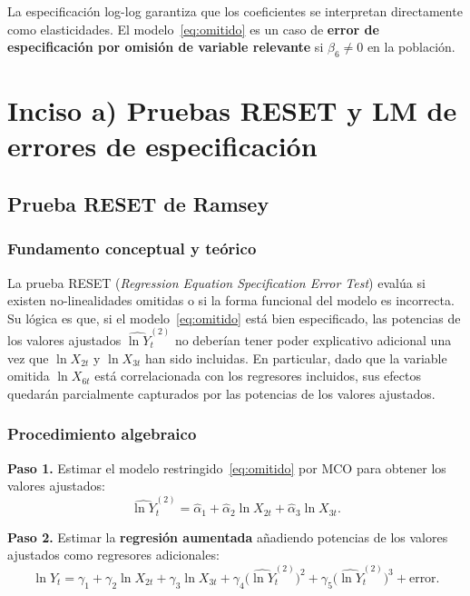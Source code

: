 \documentclass[12pt, letterpaper]{article}
\begin{document}
La especificación log-log garantiza que los coeficientes se interpretan
directamente como elasticidades. El modelo~\eqref{eq:omitido} es un
caso de \textbf{error de especificación por omisión de variable relevante}
si $\beta_6 \neq 0$ en la población.

\section{Inciso a) Pruebas RESET y LM de errores de especificación}

\subsection{Prueba RESET de Ramsey}

\subsubsection*{Fundamento conceptual y teórico}

La prueba RESET (\textit{Regression Equation Specification Error Test})
evalúa si existen no-linealidades omitidas o si la forma funcional del
modelo es incorrecta. Su lógica es que, si el modelo~\eqref{eq:omitido}
está bien especificado, las potencias de los valores ajustados
$\widehat{\ln Y}_t^{(2)}$ no deberían tener poder explicativo adicional
una vez que $\ln X_{2t}$ y $\ln X_{3t}$ han sido incluidas. En particular,
dado que la variable omitida $\ln X_{6t}$ está correlacionada con los
regresores incluidos, sus efectos quedarán parcialmente capturados por
las potencias de los valores ajustados.

\subsubsection*{Procedimiento algebraico}

\textbf{Paso 1.} Estimar el modelo restringido~\eqref{eq:omitido} por MCO
para obtener los valores ajustados:
\begin{equation}
  \widehat{\ln Y}_t^{(2)}
  = \hat{\alpha}_1 + \hat{\alpha}_2 \ln X_{2t} + \hat{\alpha}_3 \ln X_{3t}.
  \label{eq:yhat}
\end{equation}

\textbf{Paso 2.} Estimar la \textbf{regresión aumentada} añadiendo potencias
de los valores ajustados como regresores adicionales:
\begin{equation}
  \ln Y_t = \gamma_1 + \gamma_2 \ln X_{2t} + \gamma_3 \ln X_{3t}
            + \gamma_4 \bigl(\widehat{\ln Y}_t^{(2)}\bigr)^2
            + \gamma_5 \bigl(\widehat{\ln Y}_t^{(2)}\bigr)^3
            + \text{error}.
  \label{eq:reset_aumentado}
\end{equation}
\end{document}
